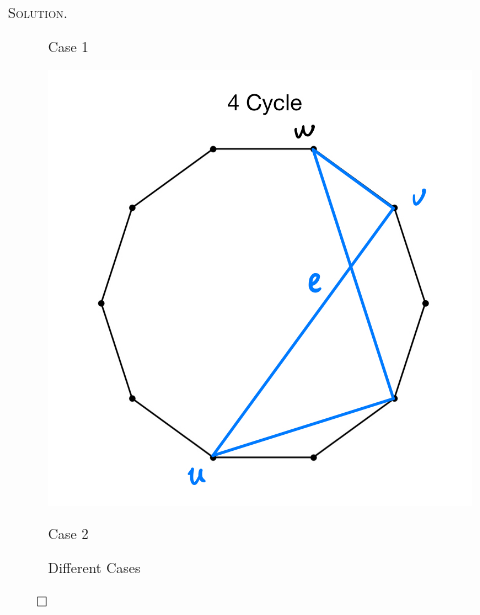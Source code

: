 \documentclass[12pt, a4paper, oneside]{ctexart}
\newenvironment{solution}{%
	\par\noindent\textsc{Solution. }\ignorespaces
}{%
	\hfill$\qed$\par
}
\begin{document}
\begin{solution}
\begin{figure}[h]
\begin{minipage}{0.45\linewidth}
				\centerline{Case 1}
			\end{minipage}
			\begin{minipage}{0.38 \linewidth}
				\vspace{3pt}
				\centerline{\includegraphics[width=\textwidth]{figure/C2.jpg}}
			 
				\centerline{Case 2}
			\end{minipage}
			\caption{Different Cases}
			\label{fig:Cases}
		\end{figure}

	\end{solution}

	
\end{document}
